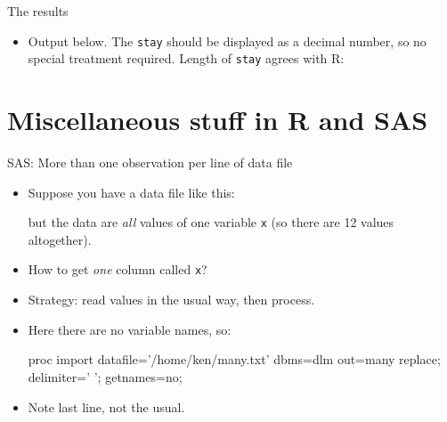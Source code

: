 \documentclass[unknownkeysallowed]{beamer}\usepackage[]{graphicx}\usepackage[]{color}
\begin{document}
\begin{frame}[fragile]{The results}
  
  \begin{itemize}
  \item Output below. The \texttt{stay} should be displayed as a
    decimal number, so no special treatment required.
    Length of \texttt{stay} agrees with R:


  \end{itemize}
  
  
\end{frame}





\section{Miscellaneous stuff in R and SAS}

\frame{\sectionpage}





\begin{frame}[fragile]{SAS: More than one observation per line of data file}
  
  \begin{itemize}
  \item Suppose you have a data file like this:
    


but the data are \emph{all} values of one variable \texttt{x} (so
there are 12 values altogether).
\item How to get \emph{one} column called \texttt{x}?
\item Strategy: read values in the usual way, then process.
\item Here there are no variable names, so:

  \begin{footnotesize}
  \begin{Datastep}
proc import
  datafile='/home/ken/many.txt'
    dbms=dlm out=many replace;
  delimiter=' ';
  getnames=no;
  \end{Datastep}
    
  \end{footnotesize}

\item Note last line, not the usual.

  \end{itemize}
  
\end{frame}
\end{document}
